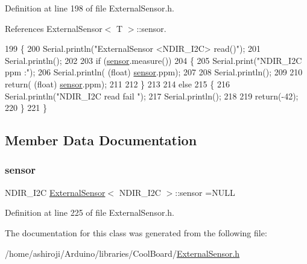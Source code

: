 Definition at line 198 of file External\+Sensor.\+h.



References External\+Sensor$<$ T $>$\+::sensor.


\begin{DoxyCode}
199     \{
200         Serial.println(\textcolor{stringliteral}{"ExternalSensor <NDIR\_I2C> read()"});
201         Serial.println();
202 
203         \textcolor{keywordflow}{if} (\hyperlink{classExternalSensor_3_01NDIR__I2C_01_4_ae541c9cece7c38674b70114cdb74a7dc}{sensor}.measure())
204         \{
205             Serial.print(\textcolor{stringliteral}{"NDIR\_I2C ppm :"});
206             Serial.println( (\textcolor{keywordtype}{float}) \hyperlink{classExternalSensor_3_01NDIR__I2C_01_4_ae541c9cece7c38674b70114cdb74a7dc}{sensor}.ppm);
207             
208             Serial.println();           
209 
210             \textcolor{keywordflow}{return}( (\textcolor{keywordtype}{float}) \hyperlink{classExternalSensor_3_01NDIR__I2C_01_4_ae541c9cece7c38674b70114cdb74a7dc}{sensor}.ppm);
211             
212         \}
213         
214         \textcolor{keywordflow}{else}
215         \{
216             Serial.println(\textcolor{stringliteral}{"NDIR\_I2C read fail "});
217             Serial.println();
218 
219             \textcolor{keywordflow}{return}(-42);
220         \}
221     \}
\end{DoxyCode}


\subsection{Member Data Documentation}
\mbox{\label{classExternalSensor_3_01NDIR__I2C_01_4_ae541c9cece7c38674b70114cdb74a7dc}} 
\subsubsection{\texorpdfstring{sensor}{sensor}}
{\footnotesize\ttfamily N\+D\+I\+R\+\_\+\+I2C \hyperlink{classExternalSensor}{External\+Sensor}$<$ N\+D\+I\+R\+\_\+\+I2C $>$\+::sensor =N\+U\+LL\hspace{0.3cm}{\ttfamily [private]}}



Definition at line 225 of file External\+Sensor.\+h.



The documentation for this class was generated from the following file\+:\begin{DoxyCompactItemize}
\item 
/home/ashiroji/\+Arduino/libraries/\+Cool\+Board/\hyperlink{ExternalSensor_8h}{External\+Sensor.\+h}\end{DoxyCompactItemize}
